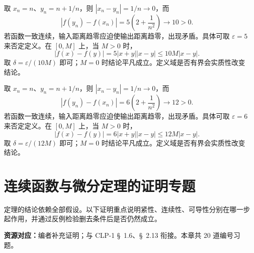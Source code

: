 \documentclass[UTF8,12pt,a4paper,fontset=fandol]{ctexart}
\begin{document}
\begin{solve}\label{ans:c6q23}
取 $x_n=n$、$y_n=n+1/n$，则 $|x_n-y_n|=1/n\to0$，而
\[
|f(y_n)-f(x_n)|=5\left(2+\frac1{n^2}\right)\longrightarrow 10>0.
\]
若函数一致连续，输入距离趋零应迫使输出距离趋零，出现矛盾。具体可取 $\varepsilon=5$ 来否定定义。在 $[0,M]$ 上，当 $M>0$ 时，
\[
|f(x)-f(y)|=5|x+y||x-y|\le 10M|x-y|.
\]
取 $\delta=\varepsilon/(10M)$ 即可；$M=0$ 时结论平凡成立。定义域是否有界会实质性改变结论。
\end{solve}

\begin{solve}\label{ans:c6q24}
取 $x_n=n$、$y_n=n+1/n$，则 $|x_n-y_n|=1/n\to0$，而
\[
|f(y_n)-f(x_n)|=6\left(2+\frac1{n^2}\right)\longrightarrow 12>0.
\]
若函数一致连续，输入距离趋零应迫使输出距离趋零，出现矛盾。具体可取 $\varepsilon=6$ 来否定定义。在 $[0,M]$ 上，当 $M>0$ 时，
\[
|f(x)-f(y)|=6|x+y||x-y|\le 12M|x-y|.
\]
取 $\delta=\varepsilon/(12M)$ 即可；$M=0$ 时结论平凡成立。定义域是否有界会实质性改变结论。
\end{solve}

\clearpage
\section{连续函数与微分定理的证明专题}\label{sec:ch7}
定理的结论依赖全部假设。以下证明重点说明紧性、连续性、可导性分别在哪一步起作用，并通过反例检验删去条件后是否仍然成立。

\textbf{资源对应：}编者补充证明；与 CLP-1 \S~1.6、\S~2.13 衔接。本章共 20 道编号习题。
\end{document}
